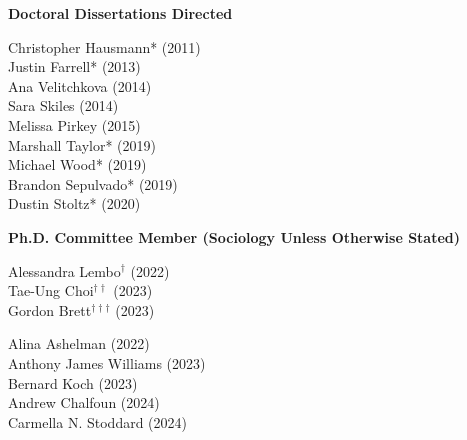 
\noindent \textbf{Doctoral Dissertations Directed }

\begin{multicols}{2}
    \noindent
    Christopher Hausmann\textcolor{uclablue}{*} (2011) \\
    Justin Farrell\textcolor{uclablue}{*} (2013) \\
    Ana Velitchkova (2014) \\
    Sara Skiles (2014) \\
    Melissa Pirkey (2015) \\
    Marshall Taylor\textcolor{uclablue}{*} (2019) \\
    Michael Wood\textcolor{uclablue}{*} (2019) \\
    Brandon Sepulvado\textcolor{uclablue}{*} (2019) \\
    Dustin Stoltz\textcolor{uclablue}{*} (2020) 
\end{multicols}
\medskip

\medskip
\noindent \textbf{Ph.D. Committee Member (Sociology Unless Otherwise Stated)} 

\begin{multicols}{2} \noindent
    Alessandra Lembo\textcolor{uclablue}{$^{\dag}$} (2022) \\
    Tae-Ung Choi\textcolor{uclablue}{$^{\dag \dag}$} (2023) \\
    Gordon Brett\textcolor{uclablue}{$^{\dag \dag \dag}$} (2023) \\
\end{multicols}

\begin{multicols}{2} \noindent
    Alina Ashelman (2022) \\
    Anthony James Williams (2023) \\
    Bernard Koch (2023) \\
    Andrew Chalfoun (2024) \\
    Carmella N. Stoddard (2024) 
\end{multicols}

